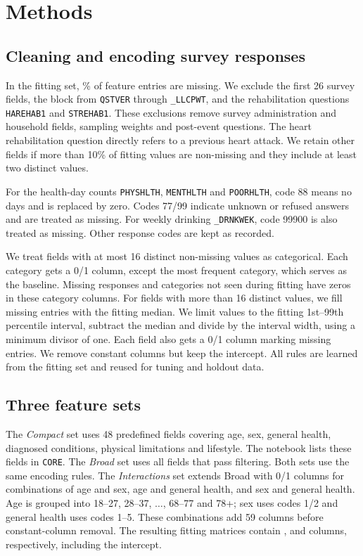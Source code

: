 \documentclass[10pt,conference,compsocconf]{IEEEtran}
\begin{document}
\section{Methods}
\subsection{Cleaning and encoding survey responses}
In the fitting set, \FitMissing{}\% of feature entries are missing. We exclude the first 26 survey fields, the block from \texttt{QSTVER} through \texttt{\_LLCPWT}, and the rehabilitation questions \texttt{HAREHAB1} and \texttt{STREHAB1}. These exclusions remove survey administration and household fields, sampling weights and post-event questions. The heart rehabilitation question directly refers to a previous heart attack. We retain other fields if more than 10\% of fitting values are non-missing and they include at least two distinct values.

For the health-day counts \texttt{PHYSHLTH}, \texttt{MENTHLTH} and \texttt{POORHLTH}, code 88 means no days and is replaced by zero. Codes 77/99 indicate unknown or refused answers and are treated as missing. For weekly drinking \texttt{\_DRNKWEK}, code 99900 is also treated as missing. Other response codes are kept as recorded.

We treat fields with at most 16 distinct non-missing values as categorical. Each category gets a 0/1 column, except the most frequent category, which serves as the baseline. Missing responses and categories not seen during fitting have zeros in these category columns. For fields with more than 16 distinct values, we fill missing entries with the fitting median. We limit values to the fitting 1st--99th percentile interval, subtract the median and divide by the interval width, using a minimum divisor of one. Each field also gets a 0/1 column marking missing entries. We remove constant columns but keep the intercept. All rules are learned from the fitting set and reused for tuning and holdout data.

\subsection{Three feature sets}
The \emph{Compact} set uses 48 predefined fields covering age, sex, general health, diagnosed conditions, physical limitations and lifestyle. The notebook lists these fields in \texttt{CORE}. The \emph{Broad} set uses all \RawFeatures{} fields that pass filtering. Both sets use the same encoding rules. The \emph{Interactions} set extends Broad with 0/1 columns for combinations of age and sex, age and general health, and sex and general health. Age is grouped into 18--27, 28--37, $\ldots$, 68--77 and 78+; sex uses codes 1/2 and general health uses codes 1--5. These combinations add 59 columns before constant-column removal. The resulting fitting matrices contain \CompactDim{}, \BroadDim{} and \InteractionDim{} columns, respectively, including the intercept.
\end{document}

